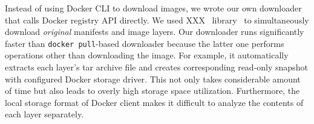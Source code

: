 %
Instead of using Docker CLI to download images,
we wrote our own downloader that calls Docker registry API directly.
We used XXX~ library~\cite{docker-registry-library} to simultaneously
download \emph{original} manifests and image layers. 
%
%
%
%
%
Our downloader runs significantly
faster than \texttt{docker pull}-based downloader
because the latter one performs
operations other than downloading the
image.
%
For example, it automatically extracts each layer's tar archive file
and creates corresponding read-only snapshot with  configured Docker storage driver.
This
not only takes considerable amount of time but also leads
to overly high storage space utilization.
%
%
Furthermore, the local storage format of Docker client makes it difficult
to analyze the contents of each layer separately.
%
%


